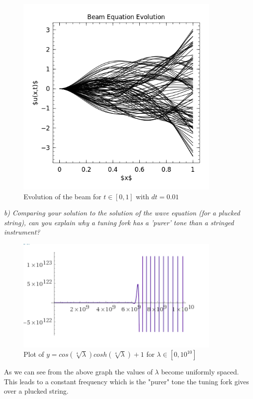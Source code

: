 \documentclass[12pt]{article}
\theoremstyle{remark}
\begin{document}
\begin{figure}[H]
	\centering
	\includegraphics[width=10cm]{Q1_BeamEq_1.png}
	\caption*{Evolution of the beam for $t \in [0,1]$ with $dt = 0.01$}
\end{figure}

\newpage

\textit{b) Comparing your solution to the solution of the wave equation (for a plucked string), can you explain why a tuning fork has a 'purer' tone than a stringed instrument?} \\

\begin{figure}[H]
	\centering
	\includegraphics[width=10cm]{eigenvals.png}
	\caption*{Plot of $y = cos(\sqrt[4]{\lambda})cosh(\sqrt[4]{\lambda}) + 1$ for $\lambda \in [0,10^{10}]$}
\end{figure}


As we can see from the above graph the values of $\lambda$ become uniformly spaced. This leads to a constant frequency which is the "purer" tone the tuning fork gives over a plucked string. 
\end{document}
